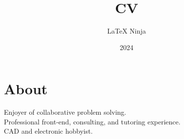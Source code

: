 \documentclass[lighthipster]{simplehipstercv}
\title{CV}
\author{\LaTeX{} Ninja}
\date{2024}
\begin{document}
    
    
    \thispagestyle{empty}
    \vspace{5em}
    \small
    
    \begin{minipage}[t]{1\textwidth}
    \section*{About}
    Enjoyer of collaborative problem solving.\\
    Professional front-end, consulting, and tutoring experience.\\
    CAD and electronic hobbyist.
    \end{minipage}    
    \bigskip
\end{document}

